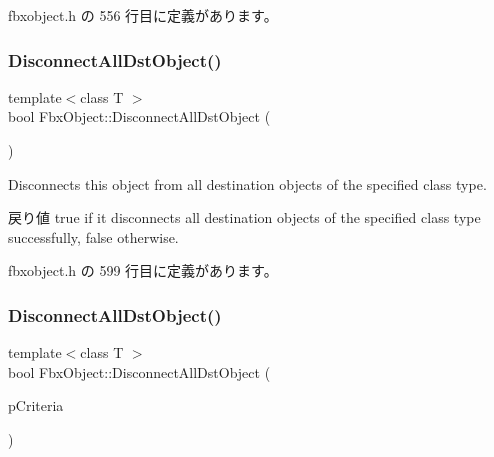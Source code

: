  fbxobject.\+h の 556 行目に定義があります。

\mbox{\label{class_fbx_object_aa3aab1135cdd8e63c3255e17f926d950}} 
\subsubsection{\texorpdfstring{Disconnect\+All\+Dst\+Object()}{DisconnectAllDstObject()}\hspace{0.1cm}{\footnotesize\ttfamily [3/4]}}
{\footnotesize\ttfamily template$<$class T $>$ \\
bool Fbx\+Object\+::\+Disconnect\+All\+Dst\+Object (\begin{DoxyParamCaption}{ }\end{DoxyParamCaption})\hspace{0.3cm}{\ttfamily [inline]}}

Disconnects this object from all destination objects of the specified class type. \begin{DoxyReturn}{戻り値}
{\ttfamily true} if it disconnects all destination objects of the specified class type successfully, {\ttfamily false} otherwise. 
\end{DoxyReturn}


 fbxobject.\+h の 599 行目に定義があります。

\mbox{\label{class_fbx_object_afd459bbb653d2a31e5c03dfdb64e649b}} 
\subsubsection{\texorpdfstring{Disconnect\+All\+Dst\+Object()}{DisconnectAllDstObject()}\hspace{0.1cm}{\footnotesize\ttfamily [4/4]}}
{\footnotesize\ttfamily template$<$class T $>$ \\
bool Fbx\+Object\+::\+Disconnect\+All\+Dst\+Object (\begin{DoxyParamCaption}\item[{const \hyperlink{class_fbx_criteria}{Fbx\+Criteria} \&}]{p\+Criteria }\end{DoxyParamCaption})\hspace{0.3cm}{\ttfamily [inline]}}

